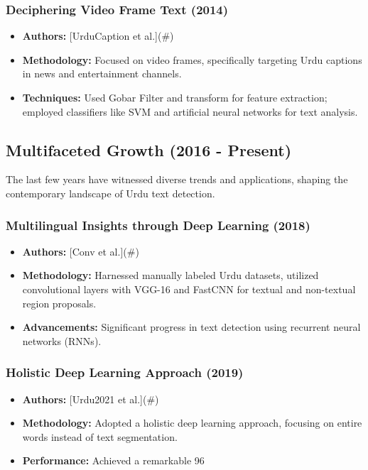 \documentclass[default,iicol]{sn-jnl}%
\begin{document}
	\subsubsection{Deciphering Video Frame Text (2014)}
	
	\begin{itemize}
		\item \textbf{Authors:} [UrduCaption et al.](\#)
		\item \textbf{Methodology:} Focused on video frames, specifically targeting Urdu captions in news and entertainment channels.
		\item \textbf{Techniques:} Used Gobar Filter and transform for feature extraction; employed classifiers like SVM and artificial neural networks for text analysis.
	\end{itemize}
	
	\subsection{Multifaceted Growth (2016 - Present)}
	
	The last few years have witnessed diverse trends and applications, shaping the contemporary landscape of Urdu text detection.
	
	\subsubsection{Multilingual Insights through Deep Learning (2018)}
	
	\begin{itemize}
		\item \textbf{Authors:} [Conv et al.](\#)
		\item \textbf{Methodology:} Harnessed manually labeled Urdu datasets, utilized convolutional layers with VGG-16 and FastCNN for textual and non-textual region proposals.
		\item \textbf{Advancements:} Significant progress in text detection using recurrent neural networks (RNNs).
	\end{itemize}
	
	\subsubsection{Holistic Deep Learning Approach (2019)}
	
	\begin{itemize}
		\item \textbf{Authors:} [Urdu2021 et al.](\#)
		\item \textbf{Methodology:} Adopted a holistic deep learning approach, focusing on entire words instead of text segmentation.
		\item \textbf{Performance:} Achieved a remarkable 96%
	\end{itemize}
	
\end{document}

